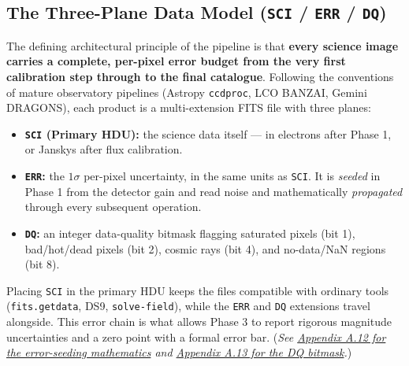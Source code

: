 \documentclass[11pt,a4paper]{article}
\begin{document}
\subsection{The Three-Plane Data Model (\texttt{SCI} / \texttt{ERR} / \texttt{DQ})}
The defining architectural principle of the pipeline is that \textbf{every science image carries a complete, per-pixel error budget from the very first calibration step through to the final catalogue}. Following the conventions of mature observatory pipelines (Astropy \texttt{ccdproc}, LCO BANZAI, Gemini DRAGONS), each product is a multi-extension FITS file with three planes:
\begin{itemize}[leftmargin=*]
    \item \textbf{\texttt{SCI} (Primary HDU):} the science data itself --- in electrons after Phase 1, or Janskys after flux calibration.
    \item \textbf{\texttt{ERR}:} the $1\sigma$ per-pixel uncertainty, in the same units as \texttt{SCI}. It is \emph{seeded} in Phase 1 from the detector gain and read noise and mathematically \emph{propagated} through every subsequent operation.
    \item \textbf{\texttt{DQ}:} an integer data-quality bitmask flagging saturated pixels (bit 1), bad/hot/dead pixels (bit 2), cosmic rays (bit 4), and no-data/NaN regions (bit 8).
\end{itemize}
Placing \texttt{SCI} in the primary HDU keeps the files compatible with ordinary tools (\texttt{fits.getdata}, DS9, \texttt{solve-field}), while the \texttt{ERR} and \texttt{DQ} extensions travel alongside. This error chain is what allows Phase 3 to report rigorous magnitude uncertainties and a zero point with a formal error bar. (\textit{See \hyperref[app:errbudget]{Appendix A.12 for the error-seeding mathematics} and \hyperref[app:dqmask]{Appendix A.13 for the DQ bitmask}.})

\newpage
\end{document}
